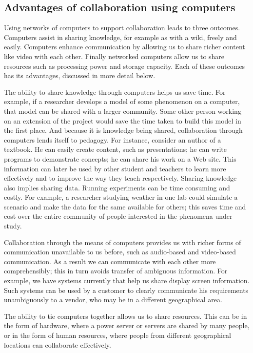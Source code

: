 \subsection{Advantages of collaboration using computers}
Using networks of computers to support collaboration leads to three
outcomes.  Computers assist in sharing knowledge, for example as with
a wiki, freely and easily.  Computers enhance communication by
allowing us to share richer content like video with each
other. Finally networked computers allow us to share resources such as
processing power and storage capacity. Each of these outcomes has its
advantages, discussed in more detail below.

The ability to share knowledge through computers helps us save
time. For example, if a researcher develops a model of some phenomenon
on a computer, that model can be shared with a larger community. Some
other person working on an extension of the project would save the
time taken to build this model in the first place.  And because it is
knowledge being shared, collaboration through computers lends itself
to pedagogy. For instance, consider an author of a textbook. He can
easily create content, such as presentations; he can write programs to
demonstrate concepts; he can share his work on a Web site. This
information can later be used by other student and teachers to learn
more effectively and to improve the way they teach
respectively. Sharing knowledge also implies sharing data. Running
experiments can be time consuming and costly. For example, a
researcher studying weather in one lab could simulate a scenario and
make the data for the same available for others; this saves time and
cost over the entire community of people interested in the phenomena
under study.

Collaboration through the means of computers provides us with richer
forms of communication unavailable to us before, such as audio-based
and video-based communication. As a result we can communicate with
each other more comprehensibly; this in turn avoids transfer of
ambiguous information. For example, we have systems currently that
help us share display screen information.  Such systems can be used by
a customer to clearly communicate his requirements unambiguously to a
vendor, who may be in a different geographical area.

The ability to tie computers together allows us to share
resources. This can be in the form of hardware, where a power server
or servers are shared by many people, or in the form of human
resources, where people from different geographical locations can
collaborate effectively.


